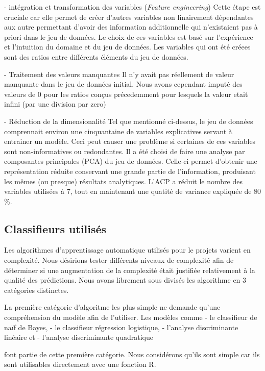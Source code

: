 - intégration et transformation des variables (\textit{Feature engineering}) 
Cette étape est cruciale car elle permet de créer d'autres variables non linairement dépendantes aux autre permettant d'avoir des information additionnelle qui n'existaient pas à priori dans le jeu de données. Le choix de ces variables est basé sur l'expérience et l'intuition du domaine et du jeu de données.
Les variables qui ont été créees sont des ratios entre différents éléments du jeu de données.

- Traitement des valeurs manquantes
Il n'y avait pas réellement de valeur manquante dans le jeu de données initial. Nous avons cependant imputé des valeurs de 0 pour les ratios conçus précedemment pour lesquels la valeur etait infini (par une division par zero)

- Réduction de la dimensionalité
Tel que mentionné ci-dessus, le jeu de données comprennait environ une cinquantaine de variables explicatives servant à entrainer un modèle. Ceci peut causer une problème si certaines de ces variables sont non-informatives ou redondantes. Il a été choisi de faire une analyse par composantes principales (PCA) du jeu de données. Celle-ci permet d'obtenir une représentation réduite conservant une grande partie de l'information, produisant les mêmes (ou presque) résultats analytiques. L'ACP a réduit le nombre des variables utilisées à 7, tout en maintenant une quatité de variance expliquée de 80 \%. 

\subsection{Classifieurs utilisés}

Les algorithmes d'apprentissage automatique utilisés pour le projets varient en complexité. Nous désirions tester différents niveaux de complexité afin de déterminer si une augmentation de la complexité était justifiée relativement à la qualité des prédictions. Nous avons librement sous divisés les algorithme en 3 catégories distinctes. 

La première catégorie d'algoritme les plus simple ne demande qu'une compréhension du modèle afin de l'utiliser. Les modèles comme 
- le classifieur de naïf de Bayes, 
- le classifieur régression logistique, 
- l'analyse discriminante linéaire et 
- l'analyse discriminante quadratique 

font partie de cette première catégorie. Nous considérons qu'ils sont simple car ils sont utilisables directement avec une fonction R. 

